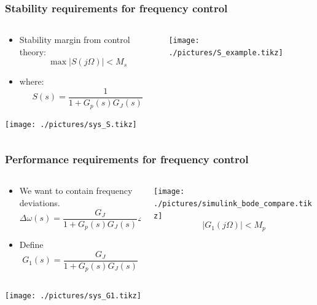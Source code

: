 \begin{frame}
	\frametitle{Stability requirements for frequency control}
	\begin{columns}
			\begin{column}[T]{0.5\textwidth}
			\begin{itemize}
				\item Stability margin from control theory:
				\begin{equation}
					\max |S(j\Omega)| <	M_s
				\end{equation}
			\item where:
				\begin{equation}
						S(s) = \frac{1}{1+G_p(s)G_J(s)}
				\end{equation}
			\end{itemize}
			\texttt{[image: ./pictures/sys\_S.tikz]}
		\end{column}
		\begin{column}[T]{0.5\textwidth}
				\texttt{[image: ./pictures/S\_example.tikz]}
		\end{column}
	\end{columns}
\end{frame}
\begin{frame}
	\frametitle{Performance requirements for frequency control}
	\begin{columns}
			\begin{column}[T]{0.5\textwidth}
			\begin{itemize}
				\item We want to contain frequency deviations.
					\begin{equation}
							\Delta \omega(s) = \frac{G_{J}}{1+G_p(s)G_J(s)}\Delta P_e(s)
					\end{equation}
				\item Define
					\begin{equation}
						G_1(s) = \frac{G_{J}}{1+G_p(s)G_J(s)}
					\end{equation}
			\end{itemize}
		\end{column}
		\begin{column}[T]{0.5\textwidth}
			\texttt{[image: ./pictures/simulink\_bode\_compare.tikz]}
			\begin{equation}
				|G_1(j\Omega)| < M_p
		\end{equation}
		\end{column}
	\end{columns}
	\texttt{[image: ./pictures/sys\_G1.tikz]}
\end{frame}
